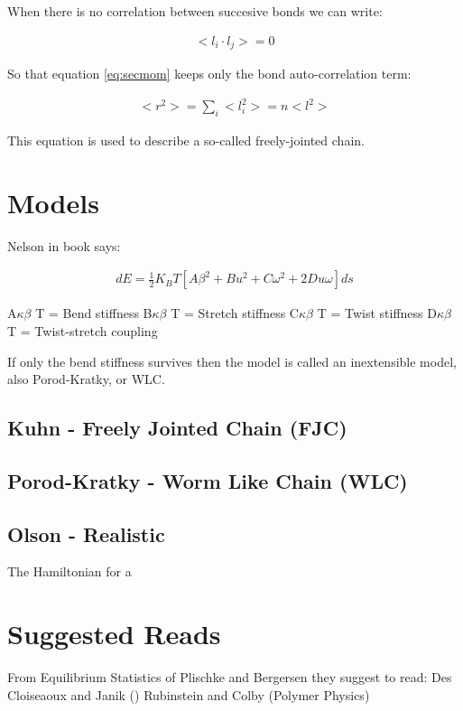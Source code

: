 When there is no correlation between succesive bonds we can write:

\begin{gather}
\label{eq:nocorr}
<l_{i} \cdot l_{j}> = 0
\end{gather}

So that equation \ref{eq:secmom} keeps only the bond auto-correlation term:

\begin{gather}
<r^2> = \sum_{i}<l_{i}^2> = n<l^2>
\end{gather}  

This equation is used to describe a so-called freely-jointed chain.





\section{Models}

Nelson in book says:

\begin{gather}
dE=\frac{1}{2} K_{B}T [A\beta^2+Bu^2+C\omega^2+2Du\omega] ds
\end{gather}  

A$\kappa \beta$ T = Bend stiffness
B$\kappa \beta$ T = Stretch stiffness
C$\kappa \beta$ T = Twist stiffness
D$\kappa \beta$ T = Twist-stretch coupling

If only the bend stiffness survives then the model is called an
inextensible model, also Porod-Kratky, or WLC.

\subsection{Kuhn - Freely Jointed Chain (FJC)}

\subsection{Porod-Kratky - Worm Like Chain (WLC)}

\subsection{Olson - Realistic}

The Hamiltonian for a \cite{czapla2009}





\section{Suggested Reads}

From Equilibrium Statistics of Plischke and Bergersen they suggest to
read:
Des Cloiseaoux and Janik ()
Rubinstein and Colby (Polymer Physics)

